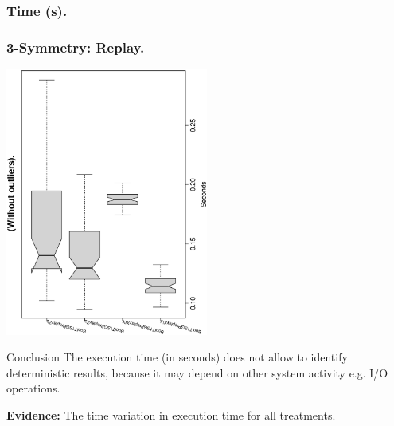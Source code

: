 \documentclass[18pt,c]{beamer}
\begin{document}
 \begin{frame}
 \fontsize{8pt}{9pt}\selectfont
 \frametitle{ Time (s). }

 \label{ExpCStatsTable001.tex}  
 \end{frame}

 \begin{frame}
 \frametitle{ 3-Symmetry: Replay.  }
 \begin{center}
\includegraphics[width=0.5\textwidth, angle=-90]
{ExpCboxplottSeconds001.eps}
 \end{center}
 \label{ExpCboxplottSeconds001.eps}  
 \end{frame}

\begin{frame}
\vspace*{2mm}
\begin{block}{
Conclusion
}
The execution time (in seconds) does not allow to identify deterministic results,
because it may depend on other system activity e.g. I/O operations.
 
{\bf Evidence:}
The time variation in execution time for all treatments.
\end{block}
\end{frame}%
\clearpage
\end{document}
